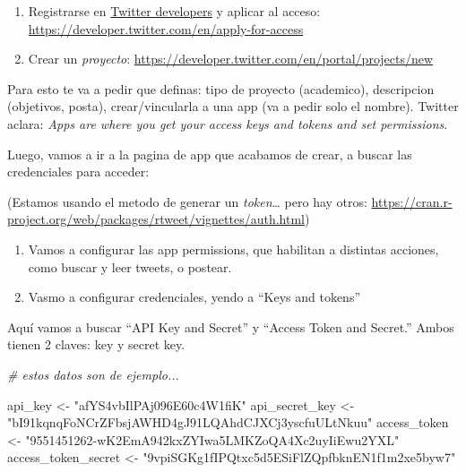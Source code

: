 \documentclass[
]{book}
\newenvironment{Shaded}{\begin{snugshade}}{\end{snugshade}}
\newcommand{\CommentTok}[1]{\textcolor[rgb]{0.56,0.35,0.01}{\textit{#1}}}
\newcommand{\NormalTok}[1]{#1}
\newcommand{\OtherTok}[1]{\textcolor[rgb]{0.56,0.35,0.01}{#1}}
\newcommand{\StringTok}[1]{\textcolor[rgb]{0.31,0.60,0.02}{#1}}
\providecommand{\tightlist}{%
  \setlength{\itemsep}{0pt}\setlength{\parskip}{0pt}}
\begin{document}
\begin{enumerate}
\def\labelenumi{\arabic{enumi}.}
\tightlist
\item
  Registrarse en \href{https://developer.twitter.com/en}{Twitter developers} y aplicar al acceso: \url{https://developer.twitter.com/en/apply-for-access}
\item
  Crear un \emph{proyecto}: \url{https://developer.twitter.com/en/portal/projects/new}
\end{enumerate}

Para esto te va a pedir que definas: tipo de proyecto (academico), descripcion (objetivos, posta), crear/vincularla a una app (va a pedir solo el nombre). Twitter aclara: \emph{Apps are where you get your access keys and tokens and set permissions}.

Luego, vamos a ir a la pagina de app que acabamos de crear, a buscar las credenciales para acceder:

(Estamos usando el metodo de generar un \emph{token}\ldots{} pero hay otros: \url{https://cran.r-project.org/web/packages/rtweet/vignettes/auth.html})

\begin{enumerate}
\def\labelenumi{\arabic{enumi}.}
\setcounter{enumi}{2}
\tightlist
\item
  Vamos a configurar las app permissions, que habilitan a distintas acciones, como buscar y leer tweets, o postear.
\item
  Vasmo a configurar credenciales, yendo a ``Keys and tokens''
\end{enumerate}

Aquí vamos a buscar ``API Key and Secret'' y ``Access Token and Secret.'' Ambos tienen 2 claves: key y secret key.

\begin{Shaded}
\begin{Highlighting}[]
\CommentTok{\# estos datos son de ejemplo...}

\NormalTok{api\_key }\OtherTok{\textless{}{-}} \StringTok{"afYS4vbIlPAj096E60c4W1fiK"}
\NormalTok{api\_secret\_key }\OtherTok{\textless{}{-}} \StringTok{"bI91kqnqFoNCrZFbsjAWHD4gJ91LQAhdCJXCj3yscfuULtNkuu"}
\NormalTok{access\_token }\OtherTok{\textless{}{-}} \StringTok{"9551451262{-}wK2EmA942kxZYIwa5LMKZoQA4Xc2uyIiEwu2YXL"}
\NormalTok{access\_token\_secret }\OtherTok{\textless{}{-}} \StringTok{"9vpiSGKg1fIPQtxc5d5ESiFlZQpfbknEN1f1m2xe5byw7"}
\end{Highlighting}
\end{Shaded}
\end{document}
